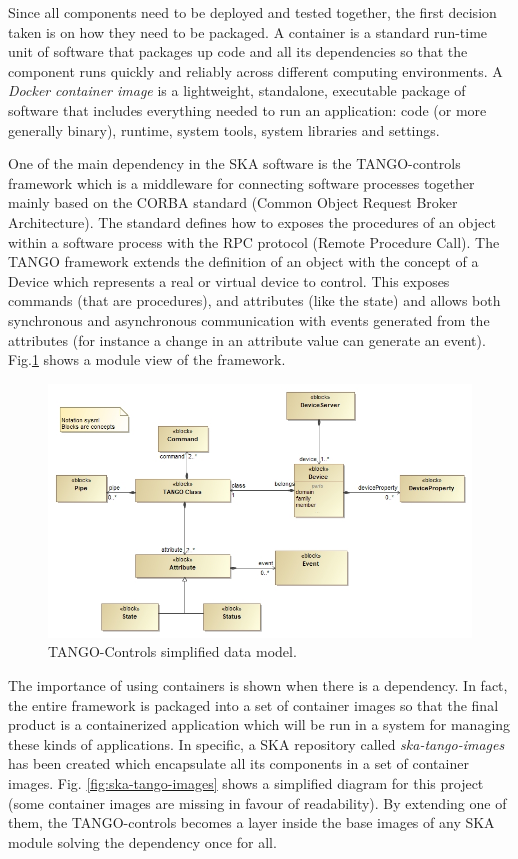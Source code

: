 \documentclass[a4paper,
               keeplastbox,   %
               ]{jacow}
\begin{document}
Since all components need to be deployed and tested together, the first decision taken is on how they need to be packaged. A container is a standard run-time unit of software that packages up code and all its dependencies so that the component runs quickly and reliably across different computing environments. A \textit{Docker}\cite{docker} \textit{container image} is a lightweight, standalone, executable package of software that includes everything needed to run an application: code (or more generally binary), runtime, system tools, system libraries and settings. 

One of the main dependency in the SKA software is the TANGO-controls\cite{tango-controls} framework which is a middleware for connecting software processes together mainly based on the CORBA standard (Common Object Request Broker Architecture). The standard defines how to exposes the procedures of an object within a software process with the RPC protocol (Remote Procedure Call). The TANGO framework extends the definition of an object with the concept of a Device which represents a real or virtual device to control. This exposes commands (that are procedures), and attributes (like the state) and allows both synchronous and asynchronous communication with events generated from the attributes (for instance a change in an attribute value can generate an event). Fig.\ref{fig:tangodatamodel} shows a module view of the framework.

\begin{figure}[!htb]
   \centering
   \includegraphics*[width=.7\columnwidth]{SimplifiedDataModel}
   \caption{TANGO-Controls simplified data model.}
   \label{fig:tangodatamodel}
\end{figure}

The importance of using containers is shown when there is a dependency. In fact, the entire framework is packaged into a set of container images\cite{ska-tango-images} so that the final product is a containerized application which will be run in a system for managing these kinds of applications. In specific, a SKA repository called \textit{ska-tango-images}\cite{ska-tango-images} has been created which encapsulate all its components in a set of container images. Fig. \ref{fig:ska-tango-images} shows a simplified diagram for this project (some container images are missing in favour of readability). By extending one of them, the TANGO-controls becomes a layer inside the base images of any SKA module solving the dependency once for all. 
\end{document}
